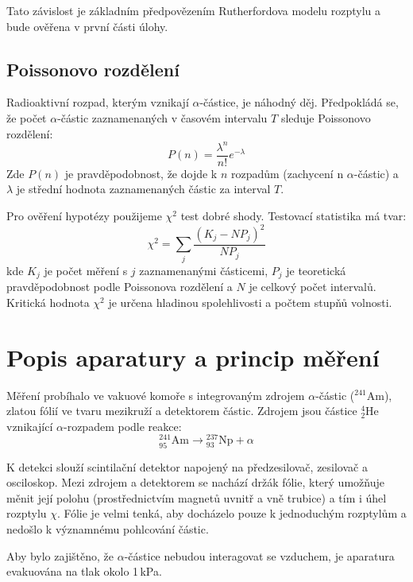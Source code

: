 \documentclass[czech,11pt,a4paper]{article}
\begin{document}
\begin{multicols}{2}
		Tato závislost je základním předpovězením Rutherfordova modelu rozptylu a bude ověřena v první části úlohy.
		
		\subsection*{Poissonovo rozdělení}
		
		Radioaktivní rozpad, kterým vznikají $\alpha$-částice, je náhodný děj. Předpokládá se, že počet $\alpha$-částic zaznamenaných v časovém intervalu $T$ sleduje Poissonovo rozdělení:
		\begin{equation}
			P(n) = \frac{\lambda^n}{n!} e^{-\lambda}
		\end{equation}
		Zde $P(n)$ je pravděpodobnost, že dojde k $n$ rozpadům (zachycení n $\alpha$-částic) a $\lambda$ je střední hodnota zaznamenaných částic za interval $T$.
		
		Pro ověření hypotézy použijeme $\chi^2$ test dobré shody. Testovací statistika má tvar:
		\begin{equation}
			\chi^2 = \sum_j \frac{(K_j - N P_j)^2}{N P_j}
		\end{equation}
		kde $K_j$ je počet měření s $j$ zaznamenanými částicemi, $P_j$ je teoretická pravděpodobnost podle Poissonova rozdělení a $N$ je celkový počet intervalů. Kritická hodnota $\chi^2$ je určena hladinou spolehlivosti a počtem stupňů volnosti.
		\section{Popis aparatury a princip měření}
		
		Měření probíhalo ve vakuové komoře s integrovaným zdrojem $\alpha$-částic ($^{241}$Am), zlatou fólií ve tvaru mezikruží a detektorem částic. Zdrojem jsou částice $^4_2$He vznikající $\alpha$-rozpadem podle reakce:
		\begin{equation}
			^{241}_{95}\mathrm{Am} \rightarrow {}^{237}_{93}\mathrm{Np} + \alpha
		\end{equation}
		
		K detekci slouží scintilační detektor napojený na předzesilovač, zesilovač a osciloskop. Mezi zdrojem a detektorem se nachází držák fólie, který umožňuje měnit její polohu (prostřednictvím magnetů uvnitř a vně trubice) a tím i úhel rozptylu $\chi$. Fólie je velmi tenká, aby docházelo pouze k jednoduchým rozptylům a nedošlo k významnému pohlcování částic.
		
		Aby bylo zajištěno, že $\alpha$-částice nebudou interagovat se vzduchem, je aparatura evakuována na tlak okolo 1\,kPa. 
		

\end{multicols}
\end{document}
